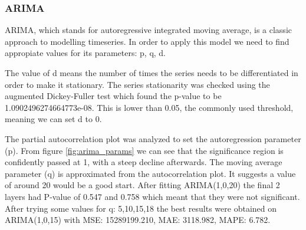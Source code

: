 \documentclass[12pt]{article}
\begin{document}
  \subsubsection{ARIMA}
  ARIMA\cite{arima}, which stands for autoregressive integrated moving average, is a classic approach 
  to modelling timeseries. In order to apply this model we need to find appropiate values for its 
  parameters: p, q, d. 
  
  The value of d means the number of times the series needs to be differentiated
  in order to make it stationary. The series stationarity was checked using the augmented Dickey-Fuller 
  test\cite{Dickey-Fuller} which found the p-value to be 1.0902496274664773e-08. This is lower than 0.05, 
  the commonly used threshold, meaning we can set d to 0. 
  
  The partial autocorrelation plot was analyzed
  to set the autoregression parameter (p). From figure \ref{fig:arima_params} we can see that the significance
  region is confidently passed at 1, with a steep decline afterwards. The moving average parameter (q) is 
  approximated from the autocorrelation plot. It suggests a value of around 20 would be a good start. 
  After fitting ARIMA(1,0,20) the final 2 layers had P-value of 0.547 and 0.758 which meant that they were 
  not significant. After trying some values for q: 5,10,15,18 the best results were obtained on ARIMA(1,0,15)
  with MSE: 15289199.210, MAE: 3118.982, MAPE: 6.782.
\end{document}
